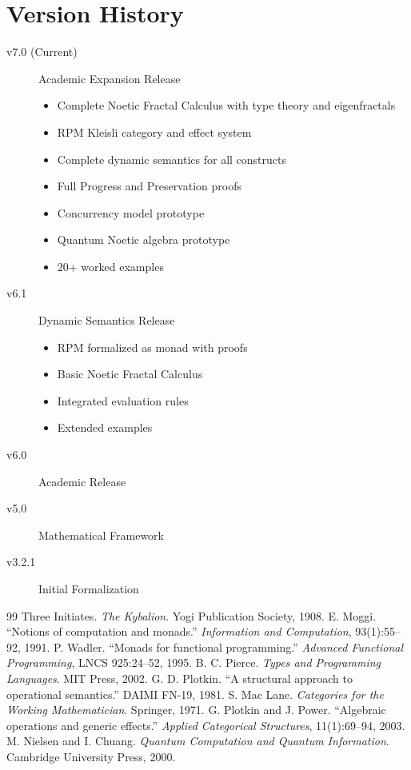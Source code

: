 \documentclass[11pt,twoside,openright]{book}
\theoremstyle{definition}
\theoremstyle{plain}
\theoremstyle{remark}
\begin{document}
\chapter{Version History}
\label{app:versions}

\begin{description}
\item[v7.0 (Current)] Academic Expansion Release
  \begin{itemize}
  \item Complete Noetic Fractal Calculus with type theory and eigenfractals
  \item RPM Kleisli category and effect system
  \item Complete dynamic semantics for all constructs
  \item Full Progress and Preservation proofs
  \item Concurrency model prototype
  \item Quantum Noetic algebra prototype
  \item 20+ worked examples
  \end{itemize}

\item[v6.1] Dynamic Semantics Release
  \begin{itemize}
  \item RPM formalized as monad with proofs
  \item Basic Noetic Fractal Calculus
  \item Integrated evaluation rules
  \item Extended examples
  \end{itemize}

\item[v6.0] Academic Release

\item[v5.0] Mathematical Framework

\item[v3.2.1] Initial Formalization
\end{description}

\backmatter

\begin{thebibliography}{99}
 Three Initiates. \textit{The Kybalion}. Yogi Publication Society, 1908.
 E. Moggi. ``Notions of computation and monads.'' \textit{Information and Computation}, 93(1):55--92, 1991.
 P. Wadler. ``Monads for functional programming.'' \textit{Advanced Functional Programming}, LNCS 925:24--52, 1995.
 B. C. Pierce. \textit{Types and Programming Languages}. MIT Press, 2002.
 G. D. Plotkin. ``A structural approach to operational semantics.'' DAIMI FN-19, 1981.
 S. Mac Lane. \textit{Categories for the Working Mathematician}. Springer, 1971.
 G. Plotkin and J. Power. ``Algebraic operations and generic effects.'' \textit{Applied Categorical Structures}, 11(1):69--94, 2003.
 M. Nielsen and I. Chuang. \textit{Quantum Computation and Quantum Information}. Cambridge University Press, 2000.
\end{thebibliography}
\end{document}
